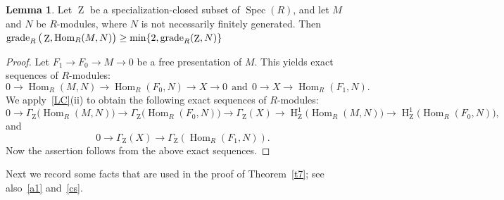 \documentclass[11pt]{amsart}
\theoremstyle{definition}
\theoremstyle{definition}
\newtheorem{lem}[thm]{Lemma}
\numberwithin{equation}{section}
\DeclareMathOperator{\gr}{\textnormal{grade}}
\DeclareMathOperator{\mz}{Z}
\DeclareMathOperator{\hh}{H}
\DeclareMathOperator{\Hom}{Hom}
\DeclareMathOperator{\Spec}{Spec}
\begin{document}
\begin{lem}\label{gr} Let $\mz$ be a specialization-closed subset of $\Spec(R)$, and let $M$ and $N$ be $R$-modules, where $N$ is not necessarily finitely generated. Then $\gr_R\big(\mz,\Hom_R(M,N)\big)\geq\min\{2,\gr_R(\mz,N)\}$
\end{lem}

\begin{proof} Let $F_1\to F_0\to M\to0$ be a free presentation of $M$. This yields exact sequences of $R$-modules: 
$$0\to\Hom_R(M,N)\to\Hom_R(F_0,N)\to X\to0\ \ \text{and}\ \ 0\to X\to\Hom_R(F_1,N).$$
We apply~\ref{LC}(ii) to obtain the following exact sequences of $R$-modules:
\[
0 \rightarrow \Gamma_{\mz}\big(\Hom_R(M,N)\big)\rightarrow\Gamma_{\mz}\big(\Hom_R(F_0,N)\big)\to\Gamma_{\mz}(X)\to\hh^1_{\mz}\big(\Hom_R(M,N)\big)\to\hh^1_{\mz}\big(\Hom_R(F_0,N)\big),
\]
and
\[
0\to\Gamma_{\mz}(X)\to\Gamma_{\mz}(\Hom_R(F_1,N)).
\]
Now the assertion follows from the above exact sequences.
\end{proof}

Next we record some facts that are used in the proof of Theorem~\ref{t7}; see also~\ref{a1} and~\ref{cs}.
\end{document}
